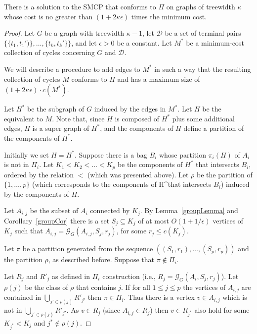 \begin{ftheo}\label{conformingPi}

There is a solution to the SMCP that conforms to \(\Pi\) on graphs of treewidth \(\kappa\) whose cost is no greater than \((1 + 2 \kappa \epsilon)\) times the minimum cost.

\end{ftheo}
\begin{proof}

Let \(G\) be a graph with treewidth \(\kappa - 1\), let \(\mathcal{D}\) be a set of terminal pairs \(\{\{t_1, t_1')\}, \dots, \{t_k, t_k'\}\}\), and  let \(\epsilon > 0\) be a constant.
Let \(M^\ast\) be a minimum-cost collection of cycles concerning \(G\) and \(\mathcal{D}\).

We will describe a procedure to add edges to \(M^\ast\) in such a way that the resulting collection of cycles \(M\) conforms to \(\Pi\) and has a maximum size of \((1 + 2\kappa \epsilon ) \cdot c(M^\ast)\).

Let \(H^\ast\) be the subgraph of \(G\) induced by the edges in \(M^\ast\). Let \(H\) be the equivalent to \(M\). Note that, since \(H\) is composed of \(H^\ast\) plus some additional edges, \(H\) is a super graph of \(H^\ast\), and the components of \(H\) define a partition of the components of \(H^\ast\).

Initially we set \(H = H^\ast\). Suppose there is a bag \(B_i\) whose partition \(\pi_i(H)\) of \(A_i\) is not in \(\Pi_i\). Let \(K_1 < K_2 < \dots < K_p\) be the components of \(H^\ast\) that intersects \(B_i\), ordered by the relation \(<\) (which was presented above). Let \(\rho\) be the partition of \(\{1, \dots, p\}\) (which corresponds to the components of H^\ast that intersects \(B_i\)) induced by the components of \(H\).

Let \(A_{i, j}\) be the subset of \(A_i\) connected by \(K_j\). By Lemma~\ref{groupLemma} and Corollary~\ref{groupCor} there is a set \(S_j \subseteq K_j\) of at most \(O(1 + 1/\epsilon)\) vertices of \(K_j\) such that \(A_{i,j} = \mathcal{G}_G(A_{i,j}, S_j, r_j)\), for some \(r_j \leq c(K_j)\).

Let \(\pi\) be a partition generated from the sequence \(((S_1, r_1), \dots, (S_p, r_p))\) and the partition \(\rho\), as described before. Suppose that \(\pi \notin \Pi_i\).

Let \(R_j\) and \(R'_j\) as defined in \(\Pi_i\) construction (i.e., \(R_j = \mathcal{G}_G(A_i, S_j, r_j)\)). Let \(\rho(j)\) be the class of \(\rho\) that contains \(j\). If for all \(1 \leq j \leq p\)  the vertices of \(A_{i,j}\) are contained in \(\bigcup_{j' \in \rho(j)}R'_{j'}\) then \(\pi \in \Pi_i\).
Thus there is a vertex \(v \in A_{i,j}\) which is not in \(\bigcup_{j' \in \rho(j)}R'_{j'}\). As \(v \in R_j\) (since \(A_{i,j} \in R_j\)) then \(v \in R_{j^\ast}\) also hold for some \(K_{j^\ast} < K_j\) and \(j^\ast \not\in \rho(j)\).


\end{proof}
